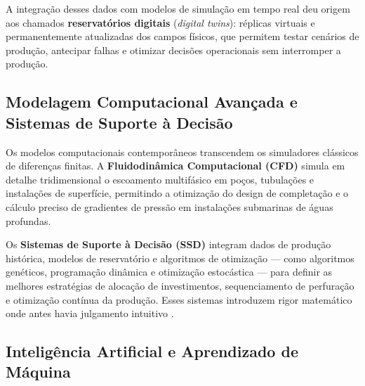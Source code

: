 \documentclass[
  12pt,
  a4paper,
  oneside,
  brazilian,
  sumario=tradicional
]{abntex2}
\begin{document}
A integração desses dados com modelos de simulação em tempo real deu
origem aos chamados \textbf{reservatórios digitais} (\textit{digital
twins}): réplicas virtuais e permanentemente atualizadas dos campos
físicos, que permitem testar cenários de produção, antecipar falhas
e otimizar decisões operacionais sem interromper a produção.

\subsection{Modelagem Computacional Avançada e Sistemas de Suporte à Decisão}

Os modelos computacionais contemporâneos transcendem os simuladores
clássicos de diferenças finitas. A \textbf{Fluidodinâmica Computacional
(CFD)} simula em detalhe tridimensional o escoamento multifásico em
poços, tubulações e instalações de superfície, permitindo a otimização
do design de completação e o cálculo preciso de gradientes de pressão
em instalações submarinas de águas profundas.

Os \textbf{Sistemas de Suporte à Decisão (SSD)} integram dados de
produção histórica, modelos de reservatório e algoritmos de otimização
— como algoritmos genéticos, programação dinâmica e otimização
estocástica — para definir as melhores estratégias de alocação de
investimentos, sequenciamento de perfuração e otimização contínua da
produção. Esses sistemas introduzem rigor matemático onde antes havia
julgamento intuitivo \cite{ahmed2010, terry2015}.

\subsection{Inteligência Artificial e Aprendizado de Máquina}
\end{document}
